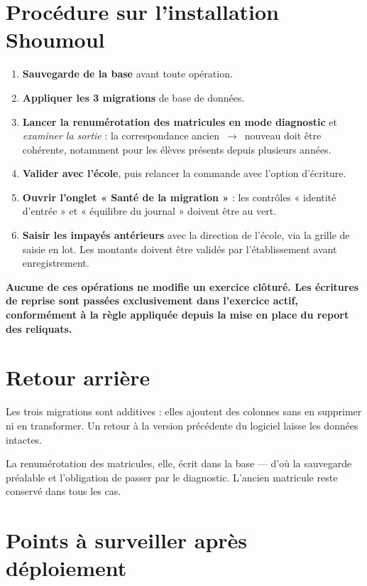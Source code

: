 \documentclass[11pt,a4paper]{report}
\newcommand{\encadre}[2]{%
  \begingroup
  \setlength{\fboxsep}{9pt}%
  \noindent\colorbox{sagibg}{%
    \begin{minipage}{\dimexpr\linewidth-2\fboxsep\relax}
    \textbf{\color{#1}#2}
    \end{minipage}}%
  \par\vspace{8pt}
  \endgroup}
\newcommand{\alerte}[1]{\encadre{sagired}{#1}}
\begin{document}
\section{Procédure sur l'installation Shoumoul}

\begin{enumerate}
\item \textbf{Sauvegarde de la base} avant toute opération.
\item \textbf{Appliquer les 3 migrations} de base de données.
\item \textbf{Lancer la renumérotation des matricules en mode diagnostic} et
      \emph{examiner la sortie} : la correspondance ancien~$\rightarrow$~nouveau
      doit être cohérente, notamment pour les élèves présents depuis plusieurs
      années.
\item \textbf{Valider avec l'école}, puis relancer la commande avec l'option
      d'écriture.
\item \textbf{Ouvrir l'onglet « Santé de la migration »} : les contrôles
      « identité d'entrée » et « équilibre du journal » doivent être au vert.
\item \textbf{Saisir les impayés antérieurs} avec la direction de l'école, via
      la grille de saisie en lot. Les montants doivent être validés par
      l'établissement avant enregistrement.
\end{enumerate}

\alerte{Aucune de ces opérations ne modifie un exercice clôturé. Les écritures
de reprise sont passées exclusivement dans l'exercice actif, conformément à la
règle appliquée depuis la mise en place du report des reliquats.}

\section{Retour arrière}

Les trois migrations sont additives : elles ajoutent des colonnes sans en
supprimer ni en transformer. Un retour à la version précédente du logiciel
laisse les données intactes.

La renumérotation des matricules, elle, écrit dans la base --- d'où la
sauvegarde préalable et l'obligation de passer par le diagnostic. L'ancien
matricule reste conservé dans tous les cas.

\section{Points à surveiller après déploiement}
\end{document}
